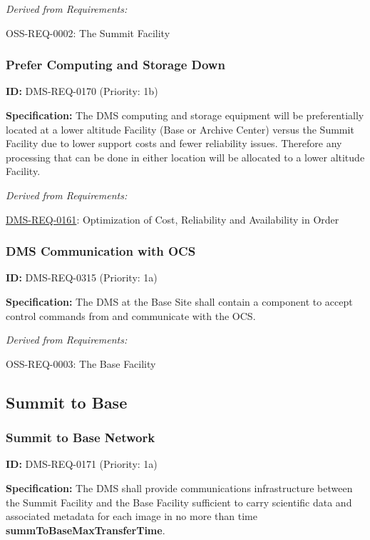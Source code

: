 \documentclass[SE,toc,lsstdraft]{lsstdoc}
\begin{document}
\emph{Derived from Requirements:}

OSS-REQ-0002:
The Summit Facility \newline

\subsubsection{Prefer Computing and Storage Down}

\label{DMS-REQ-0170}
\textbf{ID:} DMS-REQ-0170 (Priority: 1b)

\textbf{Specification: }The DMS computing and storage equipment will be preferentially located at a lower altitude Facility (Base or Archive Center) versus the Summit Facility due to lower support costs and fewer reliability issues. Therefore any processing that can be done in either location will be allocated to a lower altitude Facility.

\emph{Derived from Requirements:}

\hyperref[DMS-REQ-0161]{DMS-REQ-0161}:
Optimization of Cost, Reliability and Availability in Order \newline

\subsubsection{DMS Communication with OCS}

\label{DMS-REQ-0315}
\textbf{ID:} DMS-REQ-0315 (Priority: 1a)

\textbf{Specification:} The DMS at the Base Site shall contain a component to accept control commands from and communicate with the OCS.

\emph{Derived from Requirements:}

OSS-REQ-0003:
The Base Facility \newline

\subsection{Summit to Base}

\subsubsection{Summit to Base Network}

\label{DMS-REQ-0171}
\textbf{ID:} DMS-REQ-0171 (Priority: 1a)

\textbf{Specification:} The DMS shall provide communications infrastructure between the Summit Facility and the Base Facility sufficient to carry scientific data and associated metadata for each image in no more than time \textbf{summToBaseMaxTransferTime}.
\end{document}
